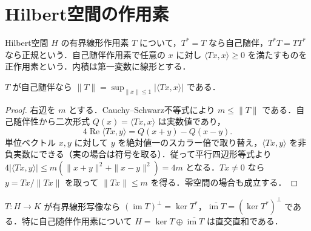 \section{Hilbert空間の作用素}
\begin{defn}
Hilbert空間 $H$ の有界線形作用素 $T$ について，$T^*=T$ なら自己随伴，$T^*T=TT^*$ なら正規という．自己随伴作用素で任意の $x$ に対し $\langle Tx,x\rangle\geq0$ を満たすものを正作用素という．内積は第一変数に線形とする．
\end{defn}
\begin{prop}[自己随伴作用素の数値的ノルム]
$T$ が自己随伴なら $\|T\|=\sup_{\|x\|\leq1}|\langle Tx,x\rangle|$ である．
\end{prop}
\begin{proof}
右辺を $m$ とする．Cauchy–Schwarz不等式により $m\leq\|T\|$ である．自己随伴性から二次形式 $Q(x)=\langle Tx,x\rangle$ は実数値であり，
\[
4\operatorname{Re}\langle Tx,y\rangle=Q(x+y)-Q(x-y).
\]
単位ベクトル $x,y$ に対して $y$ を絶対値一のスカラー倍で取り替え，$\langle Tx,y\rangle$ を非負実数にできる（実の場合は符号を取る）．従って平行四辺形等式より $4|\langle Tx,y\rangle|\leq m(\|x+y\|^2+\|x-y\|^2)=4m$ となる．$Tx\ne0$ なら $y=Tx/\|Tx\|$ を取って $\|Tx\|\leq m$ を得る．零空間の場合も成立する．
\end{proof}
\begin{prop}[核と像の直交関係]
$T:H\to K$ が有界線形写像なら $(\operatorname{im}T)^\perp=\ker T^*$，$\overline{\operatorname{im}T}=(\ker T^*)^\perp$ である．特に自己随伴作用素について $H=\ker T\oplus\overline{\operatorname{im}T}$ は直交直和である．
\end{prop}
